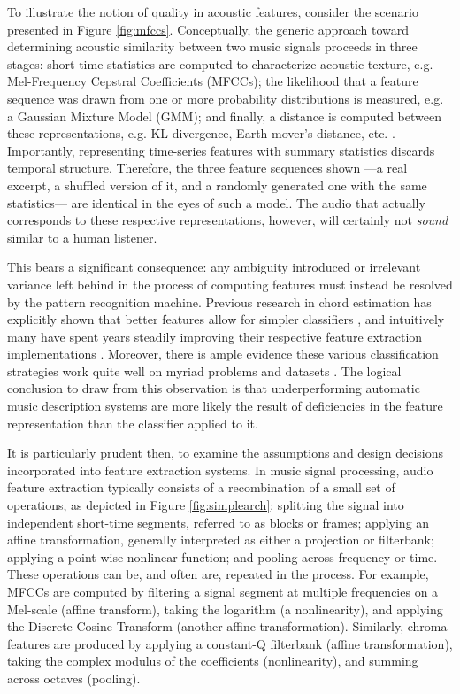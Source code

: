 To illustrate the notion of quality in acoustic features, consider the scenario presented in Figure \ref{fig:mfccs}.
Conceptually, the generic approach toward determining acoustic similarity between two music signals proceeds in three stages: short-time statistics are computed to characterize acoustic texture, e.g. Mel-Frequency Cepstral Coefficients (MFCCs); the likelihood that a feature sequence was drawn from one or more probability distributions is measured, e.g. a Gaussian Mixture Model (GMM); and finally, a distance is computed between these representations, e.g. KL-divergence, Earth mover's distance, etc. \cite{Berenzweig2004Large}.
Importantly, representing time-series features with summary statistics discards temporal structure.
Therefore, the three feature sequences shown ---a real excerpt, a shuffled version of it, and a randomly generated one with the same statistics--- are identical in the eyes of such a model.
The audio that actually corresponds to these respective representations, however, will certainly not \emph{sound} similar to a human listener.

This bears a significant consequence: any ambiguity introduced or irrelevant variance left behind in the process of computing features must instead be resolved by the pattern recognition machine.
Previous research in chord estimation has explicitly shown that better features allow for simpler classifiers \cite{Cho2010Exploring}, and intuitively many have spent years steadily improving their respective feature extraction implementations \cite{Lyon2010Sound,Mueller2011Chroma}.
Moreover, there is ample evidence these various classification strategies work quite well on myriad problems and datasets \cite{Bishop2006Pattern}.
The logical conclusion to draw from this observation is that underperforming automatic music description systems are more likely the result of deficiencies in the feature representation than the classifier applied to it.

It is particularly prudent then, to examine the assumptions and design decisions incorporated into feature extraction systems.
In music signal processing, audio feature extraction typically consists of a recombination of a small set of operations, as depicted in Figure \ref{fig:simplearch}: splitting the signal into independent short-time segments, referred to as blocks or frames; applying an affine transformation, generally interpreted as either a projection or filterbank; applying a point-wise nonlinear function; and pooling across frequency or time.
These operations can be, and often are, repeated in the process.
For example, MFCCs are computed by filtering a signal segment at multiple frequencies on a Mel-scale (affine transform), taking the logarithm (a nonlinearity), and applying the Discrete Cosine Transform (another affine transformation).
Similarly, chroma features are produced by applying a constant-Q filterbank (affine transformation), taking the complex modulus of the coefficients (nonlinearity), and summing across octaves (pooling).

